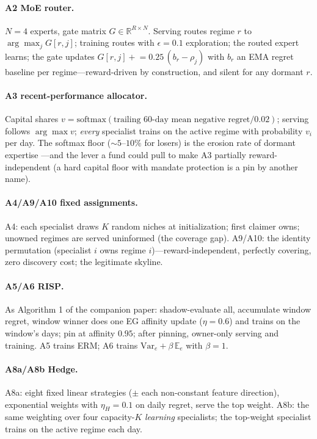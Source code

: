 \documentclass[10pt]{article}
\newcommand{\E}{\mathbb{E}}
\newcommand{\Var}{\mathrm{Var}}
\newcommand{\nm}{\textsc{RISP}}
\begin{document}
\paragraph{A2 MoE router.} $N = 4$ experts, gate matrix
$G \in \mathbb{R}^{R \times N}$. Serving routes regime $r$ to
$\arg\max_j G[r, j]$; training routes with $\epsilon = 0.1$ exploration;
the routed expert learns; the gate updates
$G[r, j] \mathrel{+}= 0.25\,(b_r - \rho_j)$ with $b_r$ an EMA regret
baseline per regime---reward-driven by construction, and silent for any
dormant $r$.

\paragraph{A3 recent-performance allocator.} Capital shares
$v = \mathrm{softmax}(\text{trailing 60-day mean negative regret}/0.02)$;
serving follows $\arg\max v$; \emph{every} specialist trains on the
active regime with probability $v_i$ per day. The softmax floor
(${\sim}5$--$10\%$ for losers) is the erosion rate of dormant expertise
---and the lever a fund could pull to make A3 partially
reward-independent (a hard capital floor with mandate protection is a
pin by another name).

\paragraph{A4/A9/A10 fixed assignments.} A4: each specialist draws $K$
random niches at initialization; first claimer owns; unowned regimes are
served uninformed (the coverage gap). A9/A10: the identity permutation
(specialist $i$ owns regime $i$)---reward-independent, perfectly
covering, zero discovery cost; the legitimate skyline.

\paragraph{A5/A6 \nm{}.} As Algorithm 1 of the companion paper:
shadow-evaluate all, accumulate window regret, window winner does one EG
affinity update ($\eta = 0.6$) and trains on the window's days; pin at
affinity $0.95$; after pinning, owner-only serving and training. A5
trains ERM; A6 trains $\Var_e + \beta\,\E_e$ with $\beta = 1$.

\paragraph{A8a/A8b Hedge.} A8a: eight fixed linear strategies
($\pm$ each non-constant feature direction), exponential weights with
$\eta_H = 0.1$ on daily regret, serve the top weight. A8b: the same
weighting over four capacity-$K$ \emph{learning} specialists; the
top-weight specialist trains on the active regime each day.
\end{document}
